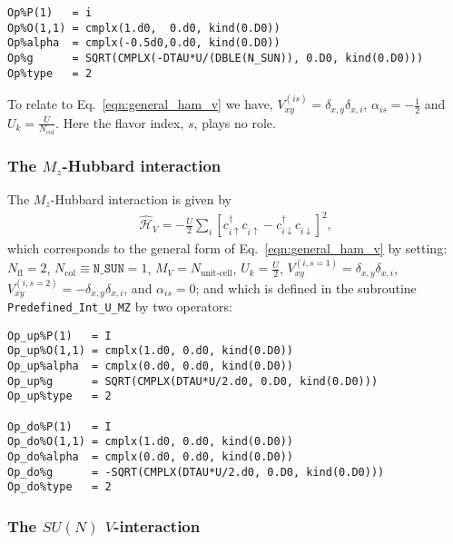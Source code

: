 \begin{lstlisting}[style=fortran]
Op%P(1)   = i
Op%O(1,1) = cmplx(1.d0,  0.d0, kind(0.D0))
Op%alpha  = cmplx(-0.5d0,0.d0, kind(0.D0))
Op%g      = SQRT(CMPLX(-DTAU*U/(DBLE(N_SUN)), 0.D0, kind(0.D0))) 
Op%type   = 2

\end{lstlisting}

To relate to  Eq.~\eqref{eqn:general_ham_v} we have,   $V_{x y}^{(is)} =  \delta_{x,y} \delta_{x,i}$, $\alpha_{is} = -\frac{1}{2}$ and $U_{k} =  \frac{U}{N_{\mathrm{col}}}$.   Here  the flavor index, $s$,  plays no role. 


\subsubsection{The $M_z$-Hubbard interaction}

The $M_z$-Hubbard interaction is given by 
\begin{align}
\hat{\mathcal{H}}_{V} = - \frac{U}{2}\sum\limits_{i}\left[
c^{\dagger}_{i \uparrow} c^{\phantom\dagger}_{i \uparrow}  -   c^{\dagger}_{i \downarrow} c^{\phantom\dagger}_{i \downarrow}  \right]^{2},
\end{align} 
which corresponds to the general form of Eq.~\eqref{eqn:general_ham_v} by setting: 
$N_{\mathrm{fl}} = 2$, $N_{\mathrm{col}} \equiv \texttt{N\_SUN} =1 $,  $M_V =  N_{\text{unit-cell}} $,  $U_{k} = \frac{U}{2}$, 
$V_{x y}^{(i, s=1)} =  \delta_{x,y} \delta_{x,i}  $,  $V_{x y}^{(i, s=2)} =  - \delta_{x,y} \delta_{x,i}  $, and $\alpha_{is}   = 0  $; and which is defined in the subroutine \texttt{Predefined\_Int\_U\_MZ} by two operators:
\begin{lstlisting}[style=fortran]
Op_up%P(1)   = I
Op_up%O(1,1) = cmplx(1.d0, 0.d0, kind(0.D0))
Op_up%alpha  = cmplx(0.d0, 0.d0, kind(0.D0))
Op_up%g      = SQRT(CMPLX(DTAU*U/2.d0, 0.D0, kind(0.D0))) 
Op_up%type   = 2

Op_do%P(1)   = I
Op_do%O(1,1) = cmplx(1.d0, 0.d0, kind(0.D0))
Op_do%alpha  = cmplx(0.d0, 0.d0, kind(0.D0))
Op_do%g      = -SQRT(CMPLX(DTAU*U/2.d0, 0.D0, kind(0.D0))) 
Op_do%type   = 2

\end{lstlisting}


\subsubsection{The $SU(N)$ $V$-interaction}

